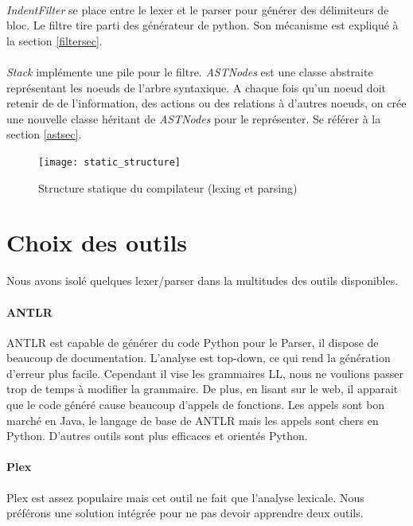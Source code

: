 \documentclass[a4paper,11pt]{article}
\begin{document}
        \paragraph{}
     \emph{IndentFilter} se place entre le lexer et le parser pour générer des délimiteurs de bloc.
     Le filtre tire parti des générateur de python.
    Son mécanisme est expliqué à la section \ref{filtersec}.
    
    \paragraph{}
    \emph{Stack} implémente une pile pour le filtre. \emph{ASTNodes} est une classe abstraite représentant les noeuds de l'arbre syntaxique.
    A chaque fois qu'un noeud doit retenir de de l'information, des actions ou des relations à d'autres noeuds, on crée une nouvelle classe héritant de \emph{ASTNodes} pour le représenter.
    Se référer à la section \ref{astsec}.
   
    \begin{figure}[h]
    \texttt{[image: static\_structure]}
    \caption{Structure statique du compilateur (lexing et parsing)}
    \label{static_structure}
    \end{figure}
    
\section{Choix des outils}
    Nous avons isolé quelques lexer/parser dans la multitudes des outils disponibles.
    
    \paragraph{ANTLR}
        ANTLR est capable de générer du code Python pour le Parser, il dispose de beaucoup de documentation.
        L'analyse est top-down, ce qui rend la génération d'erreur plus facile.
        Cependant il vise les grammaires LL, nous ne voulions passer trop de temps à modifier la grammaire.
        De plus, en lisant sur le web, il apparait que le code généré cause beaucoup d'appels de fonctions\cite{antlr_ply_pyparsing}.
        Les appels sont bon marché en Java, le langage de base de ANTLR mais les appels sont chers en Python. 
        D'autres outils sont plus efficaces et orientés Python.
        
    \paragraph{Plex}
        Plex est assez populaire mais cet outil ne fait que l'analyse lexicale.
        Nous préférons une solution intégrée pour ne pas devoir apprendre deux outils.
        
\end{document}
